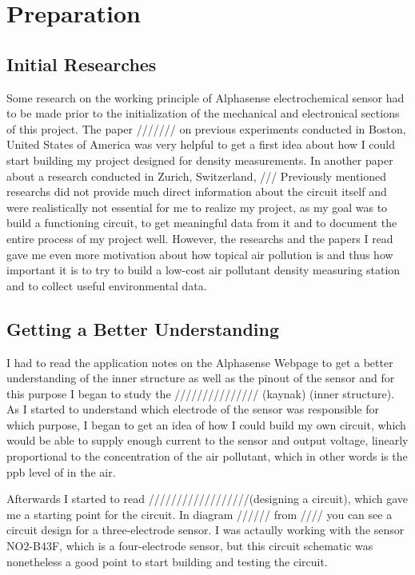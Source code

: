 \chapter{Preparation}
\label{sec:firststeps}

\section{Initial Researches}
Some research on the working principle of Alphasense  electrochemical sensor had to be made prior to the initialization of the mechanical and electronical sections of this project. The paper /////// on previous experiments conducted in Boston, United States of America was very helpful to get a first idea about how I could start building my project designed for  density measurements. In another paper about a research conducted in Zurich, Switzerland, ///    Previously mentioned researchs did not provide much direct information about the circuit itself and were realistically not essential for me to realize my project, as my goal was to build a functioning circuit, to get meaningful data from it and to document the entire process of my project well. However, the researchs and the papers I read gave me even more motivation about how topical air pollution is and thus how important it is to try to build a low-cost air pollutant density measuring station and to collect useful environmental data.

\section{Getting a Better Understanding}
I had to read the application notes on the Alphasense Webpage to get a better understanding of the inner structure as well as the pinout of the sensor and for this purpose I began to study the /////////////// (kaynak) (inner structure). As I started to understand which electrode of the sensor was responsible for which purpose, I began to get an idea of how I could build my own circuit, which would be able to supply enough current to the sensor and output voltage, linearly proportional to the concentration of the air pollutant, which in other words is the ppb level of  in the air. \par
Afterwards I started to read //////////////////(designing a circuit), which gave me a starting point for the circuit. In diagram ////// from //// you can see a circuit design for a three-electrode sensor. I was actaully working with the sensor NO2-B43F, which is a four-electrode sensor, but this circuit schematic was nonetheless a good point to start building and testing the circuit.

